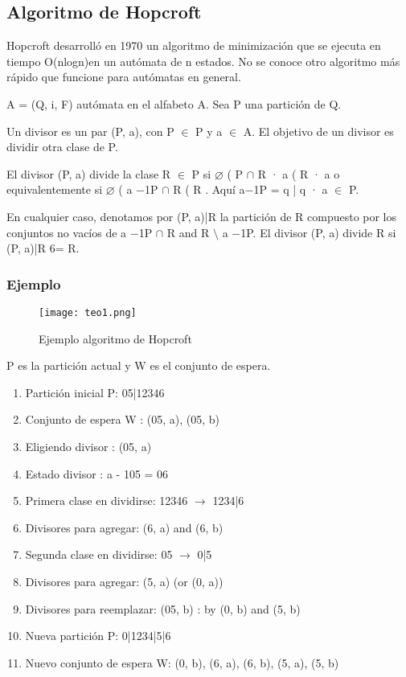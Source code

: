 \documentclass[12pt]{article}
\begin{document}
\subsection{Algoritmo de Hopcroft}

Hopcroft desarroll\'o en 1970 un algoritmo de minimizaci\'on que se ejecuta en tiempo
O(nlogn)en un aut\'omata de n estados. No se conoce otro algoritmo m\'as r\'apido que funcione para aut\'omatas en general.

A = (Q, i, F) aut\'omata en el alfabeto A. Sea P una partici\'on de Q.

Un divisor es un par (P, a), con P $\in$ P y a $\in$ A. El objetivo de un divisor es dividir otra clase de P.

El divisor (P, a) divide la clase R $\in$ P si $\varnothing$ ( P $\cap$ R · a ( R · a o equivalentemente si $\varnothing$ ( a −1P $\cap$ R ( R . Aqu\'i a−1P = {q | q · a $\in$ P}. 

En cualquier caso, denotamos por (P, a)|R la partici\'on de R compuesto por los conjuntos no vac\'ios de a −1P $\cap$ R and R $\setminus$ a −1P. El divisor (P, a) divide R si (P, a)|R 6= {R}.
\subsubsection{Ejemplo}
\begin{figure}[h]
    \centering
    \texttt{[image: teo1.png]}
    \caption{Ejemplo algoritmo de Hopcroft}
    \label{fig:my_label}
\end{figure}
P es la partición actual y W es el conjunto de espera.
\begin{enumerate}
    \item Partici\'on inicial P: 05|12346 
    \item Conjunto de espera W : (05, a), (05, b) 
    \item Eligiendo divisor : (05, a) 
    \item Estado divisor : a - 105 = 06 
    \item Primera clase en dividirse: 12346 $\rightarrow$ 1234|6 
    \item Divisores para agregar: (6, a) and (6, b) 
    \item Segunda clase en dividirse: 05 $\rightarrow$ 0|5 
    \item Divisores para agregar: (5, a) (or (0, a)) 
    \item Divisores para reemplazar: (05, b) : by (0, b) and (5, b) 
    \item Nueva partición P: 0|1234|5|6 
    \item Nuevo conjunto de espera W: (0, b), (6, a), (6, b), (5, a), (5, b)

\end{enumerate}
\end{document}
